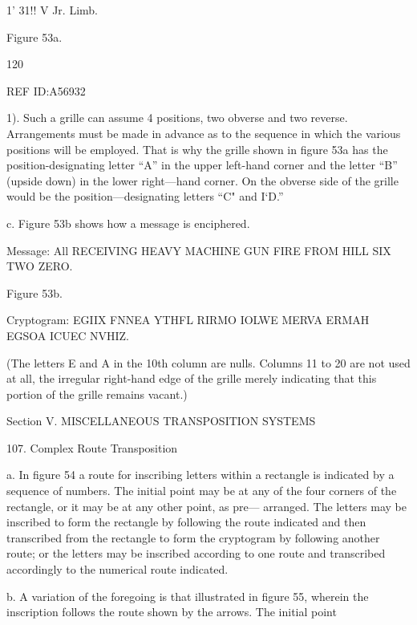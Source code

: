  

 

 

 

 

 

1' 31!! V
Jr. Limb.

 

Figure 53a.

120

 

REF ID:A56932

1). Such a grille can assume 4 positions, two obverse and two reverse.
Arrangements must be made in advance as to the sequence in which the
various positions will be employed. That is why the grille shown in ﬁgure
53a has the position-designating letter “A” in the upper left-hand corner
and the letter “B” (upside down) in the lower right—hand corner. On the
obverse side of the grille would be the position—designating letters “C"
and I‘D.”

c. Figure 53b shows how a message is enciphered.

Message:
All RECEIVING HEAVY MACHINE GUN FIRE FROM HILL SIX TWO ZERO.

 

 

 

 

Figure 53b.

Cryptogram:
EGIIX FNNEA YTHFL RIRMO IOLWE MERVA ERMAH EGSOA ICUEC NVHIZ.

(The letters E and A in the 10th column are nulls. Columns 11 to 20 are not
used at all, the irregular right-hand edge of the grille merely indicating that this
portion of the grille remains vacant.)

Section V. MISCELLANEOUS TRANSPOSITION SYSTEMS

107. Complex Route Transposition

a. In ﬁgure 54 a route for inscribing letters within a rectangle is
indicated by a sequence of numbers. The initial point may be at any of
the four corners of the rectangle, or it may be at any other point, as pre—
arranged. The letters may be inscribed to form the rectangle by following
the route indicated and then transcribed from the rectangle to form the
cryptogram by following another route; or the letters may be inscribed
according to one route and transcribed accordingly to the numerical
route indicated.

b. A variation of the foregoing is that illustrated in ﬁgure 55, wherein
the inscription follows the route shown by the arrows. The initial point

